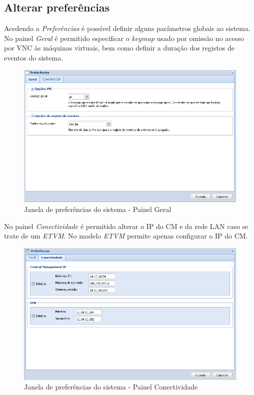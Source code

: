 \subsection{Alterar preferências}
Acedendo a \emph{Preferências} é possível definir alguns parâmetros globais ao sistema.
No painel \emph{Geral} é permitido especificar o \emph{keymap} usado por omissão no acesso por VNC às máquinas virtuais, bem como definir a duração dos registos de eventos do sistema.

\begin{figure}[H]
        \begin{center}
        \includegraphics[scale=0.5]{screenshots/preferences_general.png}
        \caption{Janela de preferências do sistema - Painel Geral}
        \label{fig:preferences_general}
        \end{center}
\end{figure}

No painel \emph{Conectividade} é permitido alterar o IP do CM e da rede LAN caso se trate de um \emph{ETVM}. No modelo \emph{ETVM} permite apenas configurar o IP do CM.

\begin{figure}[H]
        \begin{center}
        \includegraphics[scale=0.5]{screenshots/preferences_conn.png}
        \caption{Janela de preferências do sistema - Painel Conectividade}
        \label{fig:preferences_conn}
        \end{center}
\end{figure}

